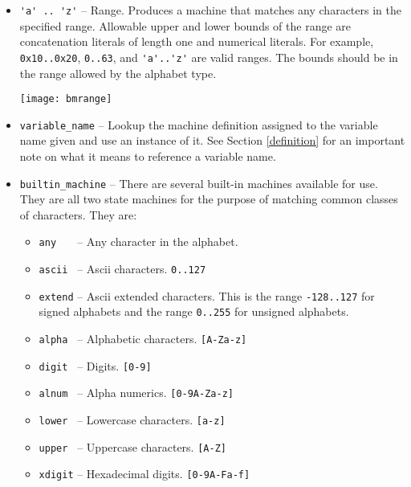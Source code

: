 \documentclass[letterpaper,11pt,oneside]{book}
\newcommand{\graphspace}{\vspace{10pt}}
\begin{document}
\begin{itemize}
\item \verb|'a' .. 'z'| -- Range. Produces a machine that matches any
characters in the specified range.  Allowable upper and lower bounds of the
range are concatenation literals of length one and numerical literals.  For
example, \verb|0x10..0x20|, \verb|0..63|, and \verb|'a'..'z'| are valid ranges.
The bounds should be in the range allowed by the alphabet type.


\graphspace
\begin{center}
\texttt{[image: bmrange]}
\end{center}
\graphspace

\item \verb|variable_name| -- Lookup the machine definition assigned to the
variable name given and use an instance of it. See Section \ref{definition} for
an important note on what it means to reference a variable name.

\item \verb|builtin_machine| -- There are several built-in machines available
for use. They are all two state machines for the purpose of matching common
classes of characters. They are:

\begin{itemize}

\item \verb|any   | -- Any character in the alphabet.

\item \verb|ascii | -- Ascii characters. \verb|0..127|

\item \verb|extend| -- Ascii extended characters. This is the range
\verb|-128..127| for signed alphabets and the range \verb|0..255| for unsigned
alphabets.

\item \verb|alpha | -- Alphabetic characters. \verb|[A-Za-z]|

\item \verb|digit | -- Digits. \verb|[0-9]|

\item \verb|alnum | -- Alpha numerics. \verb|[0-9A-Za-z]|

\item \verb|lower | -- Lowercase characters. \verb|[a-z]|

\item \verb|upper | -- Uppercase characters. \verb|[A-Z]|

\item \verb|xdigit| -- Hexadecimal digits. \verb|[0-9A-Fa-f]|


\end{itemize}
\end{itemize}
\end{document}
